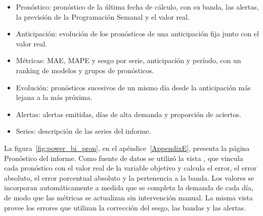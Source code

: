 \begin{itemize}
	\item Pronóstico: pronóstico de la última fecha de cálculo, con su banda, las alertas, la previsión de la Programación Semanal y el valor real.
	\item Anticipación: evolución de los pronósticos de una anticipación fija junto con el valor real.
	\item Métricas: MAE, MAPE y sesgo por serie, anticipación y período, con un ranking de modelos y grupos de pronósticos.
	\item Evolución: pronósticos sucesivos de un mismo día desde la anticipación más lejana a la más próxima.
	\item Alertas: alertas emitidas, días de alta demanda y proporción de aciertos.
	\item Series: descripción de las series del informe.
\end{itemize}

La figura~\ref{fig:power_bi_pron}, en el apéndice~\ref{AppendixE}, presenta la página Pronóstico del informe. Como fuente de datos se utilizó la vista , que vincula cada pronóstico con el valor real de la variable objetivo y calcula el error, el error absoluto, el error porcentual absoluto y la pertenencia a la banda. Los valores se incorporan automáticamente a medida que se completa la demanda de cada día, de modo que las métricas se actualizan sin intervención manual. La misma vista provee los errores que utilizan la corrección del sesgo, las bandas y las alertas. 


